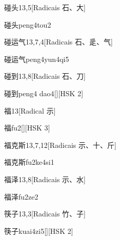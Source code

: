 \begin{entry}{碰头}{13,5}[Radicais ⽯、⼤]
  \begin{phonetics}{碰头}{peng4tou2}
  \end{phonetics}
\end{entry}

\begin{entry}{碰运气}{13,7,4}[Radicais ⽯、⾡、⽓]
  \begin{phonetics}{碰运气}{peng4yun4qi5}
  \end{phonetics}
\end{entry}

\begin{entry}{碰到}{13,8}[Radicais ⽯、⼑]
  \begin{phonetics}{碰到}{peng4 dao4}[][HSK 2]
  \end{phonetics}
\end{entry}

\begin{entry}{福}{13}[Radical ⽰]
  \begin{phonetics}{福}{fu2}[][HSK 3]
  \end{phonetics}
\end{entry}

\begin{entry}{福克斯}{13,7,12}[Radicais ⽰、⼗、⽄]
  \begin{phonetics}{福克斯}{fu2ke4si1}
  \end{phonetics}
\end{entry}

\begin{entry}{福泽}{13,8}[Radicais ⽰、⽔]
  \begin{phonetics}{福泽}{fu2ze2}
  \end{phonetics}
\end{entry}

\begin{entry}{筷子}{13,3}[Radicais ⽵、⼦]
  \begin{phonetics}{筷子}{kuai4zi5}[][HSK 2]
  \end{phonetics}
\end{entry}

